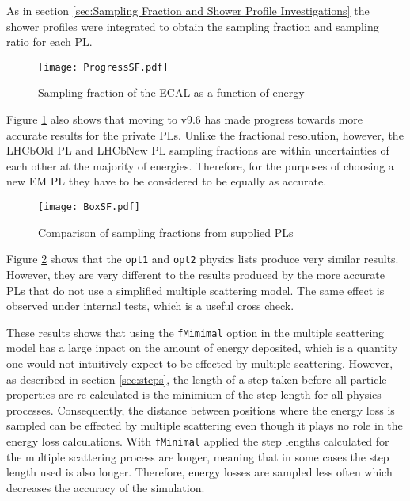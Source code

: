 As in section \ref{sec:Sampling Fraction and Shower Profile Investigations} the shower profiles were integrated to obtain the sampling fraction and sampling ratio for each PL.
\begin{figure}[h]
  \centering
  \texttt{[image: ProgressSF.pdf]}
  \caption{Sampling fraction of the ECAL as a function of energy}
  \label{fig:ProgressSF}
\end{figure}

Figure \ref{fig:ProgressSF} also shows that moving to \geant v9.6 has made progress towards more accurate results for the \lhcb private PLs.  Unlike the fractional resolution, however, the LHCbOld PL and LHCbNew PL sampling fractions are within uncertainties of each other at the majority of energies.  Therefore, for the purposes of choosing a new EM PL they have to be considered to be equally as accurate.

\begin{figure}[h]
  \centering
  \texttt{[image: BoxSF.pdf]}
  \caption{Comparison of sampling fractions from \geant supplied PLs}
  \label{fig:BoxSF}
\end{figure}
Figure \ref{fig:BoxSF} shows that the \texttt{opt1} and \texttt{opt2} physics lists produce very similar results.  However, they are very different to the results produced by the more accurate PLs that do not use a simplified multiple scattering model.  The same effect is observed under \geant internal tests, which is a useful cross check\cite{1742-6596-219-3-032045}.

These results shows that using the \texttt{fMimimal} option in the multiple scattering model has a large inpact on the amount of energy deposited, which is a quantity one would not intuitively expect to be effected by multiple scattering.  However, as described in section \ref{sec:steps}, the length of a step taken before all particle properties are re calculated is the minimium of the step length for all physics processes.  Consequently, the distance between positions where the energy loss is sampled can be effected by multiple scattering even though it plays no role in the energy loss calculations.  With \texttt{fMinimal} applied the step lengths calculated for the multiple scattering process are longer, meaning that in some cases the step length used is also longer.  Therefore, energy losses are sampled less often which decreases the accuracy of the simulation.

